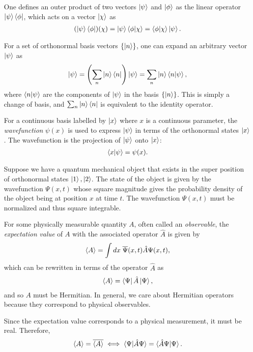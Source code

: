 One defines an outer product of two vectors $\ket{\psi}$ and $\ket{\phi}$ as the linear operator $\ket{\psi}\bra{\phi}$, which acts on a vector $\ket{\chi}$ as
\begin{align*}
    (\ket{\psi}\bra{\phi})(\chi) = \ket{\psi}\braket{\phi|\chi} = \braket{\phi|\chi}\ket{\psi}.
\end{align*}

For a set of orthonormal basis vectors $\{\ket{n}\}$, one can expand an arbitrary vector $\ket{\psi}$ as
\begin{align*}
    \ket{\psi} = \left( \sum_n \ket{n}\bra{n} \right)\ket{\psi} = \sum_n \ket{n}\braket{n|\psi},
\end{align*}
where $\braket{n|\psi}$ are the components of $\ket{\psi}$ in the basis $\{\ket{n}\}$. This is simply a change of basis, and $\sum_n \ket{n}\bra{n}$ is equivalent to the identity operator.

For a continuous basis labelled by $\ket{x}$ where $x$ is a continuous parameter, the \textit{wavefunction} $\psi(x)$ is used to express $\ket{\psi}$ in terms of the orthonormal states $\ket{x}$. The wavefunction is the projection of $\ket{\psi}$ onto $\ket{x}$:
\begin{align*}
    \braket{x|\psi} = \psi(x).
\end{align*}

Suppose we have a quantum mechanical object that exists in the super position of orthonormal states $\ket{1},\ket{2}$. The state of the object is given by the wavefunction $\Psi(x,t)$ whose square magnitude gives the probability density of the object being at position $x$ at time $t$. The wavefunction $\Psi(x,t)$ must be normalized and thus square integrable.

For some physically measurable quantity $A$, often called an \textit{observable}, the \textit{expectation value} of $A$ with the associated operator $\hat{A}$ is given by
\begin{align*}
    \braket{A} = \int dx\; \overline{\Psi}(x,t)\hat{A}\Psi(x,t),
\end{align*}
which can be rewritten in terms of the operator $\hat{A}$ as
\begin{align*}
    \braket{A} = \bra{\Psi}\hat{A}\ket{\Psi},
\end{align*}
and so $A$ must be Hermitian. In general, we care about Hermitian operators because they correspond to physical observables.

Since the expectation value corresponds to a physical measurement, it must be real. Therefore,
\begin{align*}
    \braket{A} = \overline{\braket{A}} \iff \braket{\Psi|\hat{A}\Psi} = \braket{\hat{A}\Psi|\Psi}.
\end{align*}

